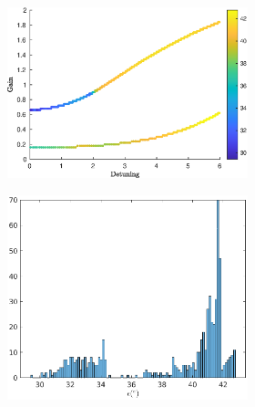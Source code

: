 \begin{figure}
\begin{subfigure}{.49\linewidth}
\begin{subfigure}{\linewidth}
			\label{fig:hybrid_defect:ellipses}
		\end{subfigure}
		\begin{subfigure}{\linewidth}
			\includegraphics[width=\linewidth]{plots/hybrid_defect/purity_3D}
			\caption{}
			\label{fig:hybrid_defect:purity_3D}
		\end{subfigure}
	\end{subfigure}
	\begin{subfigure}{0.49\linewidth}
		\begin{subfigure}{\linewidth}
			\includegraphics[width=\linewidth]{plots/hybrid_defect/purity}
			\caption{}
			\label{fig:hybrid_defect:purity}
		\end{subfigure}

\end{subfigure}
\end{figure}
